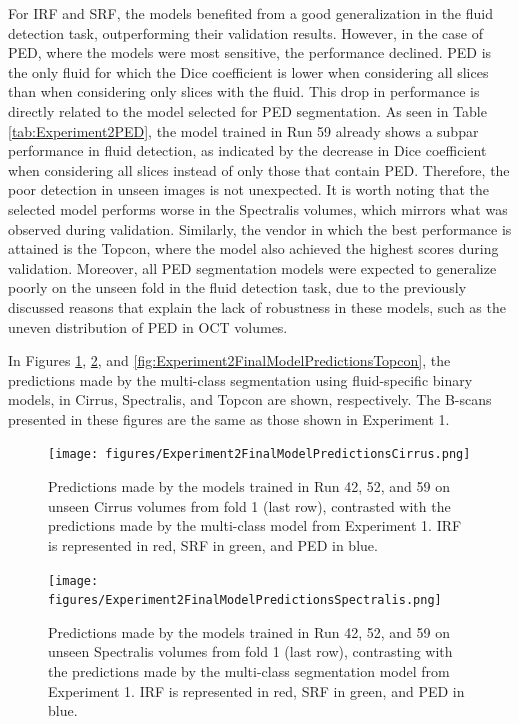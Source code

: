 For IRF and SRF, the models benefited from a good generalization in the fluid detection task, outperforming their validation results. However, in the case of PED, where the models were most sensitive, the performance declined. PED is the only fluid for which the Dice coefficient is lower when considering all slices than when considering only slices with the fluid. This drop in performance is directly related to the model selected for PED segmentation. As seen in Table \ref{tab:Experiment2PED}, the model trained in Run 59 already shows a subpar performance in fluid detection, as indicated by the decrease in Dice coefficient when considering all slices instead of only those that contain PED. Therefore, the poor detection in unseen images is not unexpected. It is worth noting that the selected model performs worse in the Spectralis volumes, which mirrors what was observed during validation. Similarly, the vendor in which the best performance is attained is the Topcon, where the model also achieved the highest scores during validation. Moreover, all PED segmentation models were expected to generalize poorly on the unseen fold in the fluid detection task, due to the previously discussed reasons that explain the lack of robustness in these models, such as the uneven distribution of PED in OCT volumes.
\par
In Figures \ref{fig:Experiment2FinalModelPredictionsCirrus}, \ref{fig:Experiment2FinalModelPredictionsSpectralis}, and \ref{fig:Experiment2FinalModelPredictionsTopcon}, the predictions made by the multi-class segmentation using fluid-specific binary models, in Cirrus, Spectralis, and Topcon are shown, respectively. The B-scans presented in these figures are the same as those shown in Experiment 1.

\begin{figure}[!ht]
	\centering
	\texttt{[image: figures/Experiment2FinalModelPredictionsCirrus.png]}
	\caption{Predictions made by the models trained in Run 42, 52, and 59 on unseen Cirrus volumes from fold 1 (last row), contrasted with the predictions made by the multi-class model from Experiment 1. IRF is represented in red, SRF in green, and PED in blue.}
	\label{fig:Experiment2FinalModelPredictionsCirrus}
\end{figure}

\begin{figure}[!ht]
	\centering
	\texttt{[image: figures/Experiment2FinalModelPredictionsSpectralis.png]}
	\caption{Predictions made by the models trained in Run 42, 52, and 59 on unseen Spectralis volumes from fold 1 (last row), contrasting with the predictions made by the multi-class segmentation model from Experiment 1. IRF is represented in red, SRF in green, and PED in blue.}
	\label{fig:Experiment2FinalModelPredictionsSpectralis}
\end{figure}

